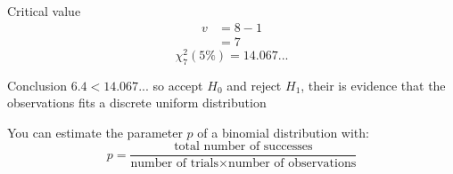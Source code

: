 \begin{example}
            \begin{step}{Critical value}
            \begin{align*}
            v &= 8 - 1 \\
            &= 7
            \end{align*}
            $$
            \chi^2_7(5\%) = 14.067...
            $$
            \end{step}

            \begin{step}{Conclusion}
            $6.4 < 14.067...$ so accept $H_0$ and reject $H_1$, their is evidence that the observations fits a discrete uniform distribution
            \end{step}
            \end{example}

            You can estimate the parameter $p$ of a binomial distribution with: 
            $$ p = \frac{\text{total number of successes}}{\text{number of trials} \times \text{number of observations}} $$
            
